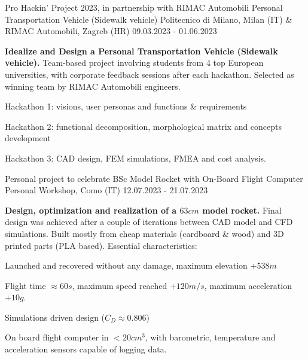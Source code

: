 \begin{cventries}
    \cventry
    {Pro Hackin' Project 2023, in partnership with RIMAC Automobili}
    {Personal Transportation Vehicle (Sidewalk vehicle)}
    {Politecnico di Milano, Milan (IT) \& RIMAC Automobili, Zagreb (HR)}
    {09.03.2023 - 01.06.2023}
    {
        \textbf{Idealize and Design a Personal Transportation Vehicle (Sidewalk vehicle).}
        \newline
        \vspace{2mm}
        Team-based project involving students from 4 top European universities, with corporate feedback sessions after each hackathon.
        Selected as winning team by RIMAC Automobili engineers.
        \newline
        \vspace{4mm}
        \begin{cvitems}
            \item {Hackathon 1: visions, user personas and functions \& requirements}
            \item {Hackathon 2: functional decomposition, morphological matrix and concepts development}
            \item {Hackathon 3: CAD design, FEM simulations, FMEA and cost analysis.}
        \end{cvitems}
        \vspace{9pt}
    }

    \cventry
    {Personal project to celebrate BSc}
    {Model Rocket with On-Board Flight Computer}
    {Personal Workshop, Como (IT)}
    {12.07.2023 - 21.07.2023}
    {
        \textbf{Design, optimization and realization of a $63cm$ model rocket.}
        \newline
        \vspace{2mm}
        Final design was achieved after a couple of iterations between CAD model and CFD simulations.
        Built mostly from cheap materials (cardboard \& wood) and 3D printed parts (PLA based).
        Essential characteristics:
        \newline
        \vspace{4mm}
        \begin{cvitems}
            \item {Launched and recovered without any damage, maximum elevation $+538m$}
            \item {Flight time $\approx 60s$, maximum speed reached $+120m/s$, maximum acceleration $+10g$.}
            \item {Simulations driven design ($C_D \approx 0.806$)}
            \item {On board flight computer in $< 20cm^3$, with barometric, temperature and acceleration sensors capable of logging data.}
        \end{cvitems}
    }

\end{cventries}
